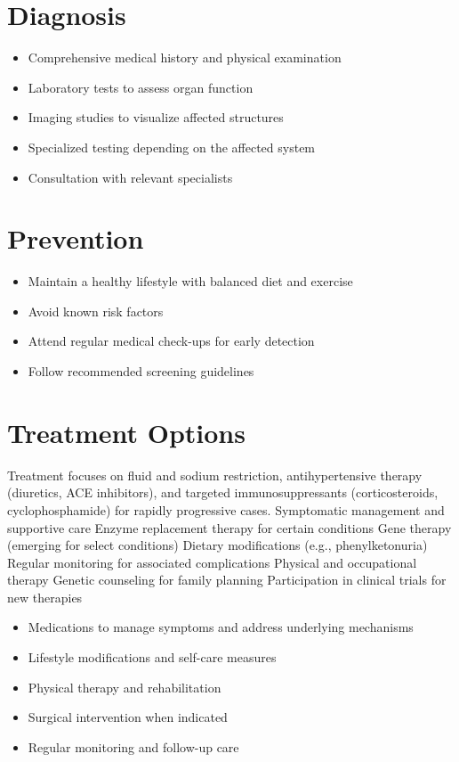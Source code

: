 \section{Diagnosis}
\begin{itemize}[noitemsep]
  \item Comprehensive medical history and physical examination
  \item Laboratory tests to assess organ function
  \item Imaging studies to visualize affected structures
  \item Specialized testing depending on the affected system
  \item Consultation with relevant specialists
\end{itemize}
\section{Prevention}
\begin{itemize}[noitemsep]
  \item Maintain a healthy lifestyle with balanced diet and exercise
  \item Avoid known risk factors
  \item Attend regular medical check-ups for early detection
  \item Follow recommended screening guidelines
\end{itemize}
\section{Treatment Options}
Treatment focuses on fluid and sodium restriction, antihypertensive therapy (diuretics, ACE inhibitors), and targeted immunosuppressants (corticosteroids, cyclophosphamide) for rapidly progressive cases. Symptomatic management and supportive care Enzyme replacement therapy for certain conditions Gene therapy (emerging for select conditions) Dietary modifications (e.g., phenylketonuria) Regular monitoring for associated complications Physical and occupational therapy Genetic counseling for family planning Participation in clinical trials for new therapies

\begin{itemize}[noitemsep]
  \item Medications to manage symptoms and address underlying mechanisms
  \item Lifestyle modifications and self-care measures
  \item Physical therapy and rehabilitation
  \item Surgical intervention when indicated
  \item Regular monitoring and follow-up care
\end{itemize}
